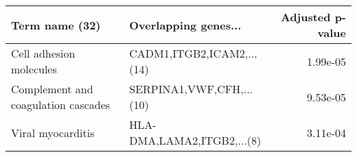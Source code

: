 \begin{tabular}{llr}
\toprule
                     Term name (32) &       Overlapping genes... &  Adjusted p-value \\
\midrule
            Cell adhesion molecules &  CADM1,ITGB2,ICAM2,...(14) &          1.99e-05 \\
Complement and coagulation cascades &   SERPINA1,VWF,CFH,...(10) &          9.53e-05 \\
                  Viral myocarditis & HLA-DMA,LAMA2,ITGB2,...(8) &          3.11e-04 \\
\bottomrule
\end{tabular}
